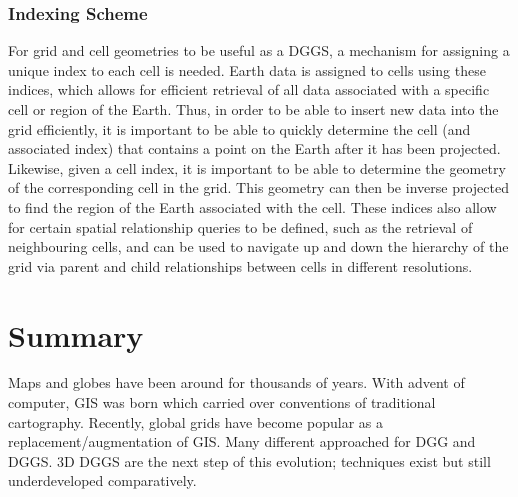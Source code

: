 \subsubsection{Indexing Scheme} \label{sec::dggs:indexing}
For grid and cell geometries to be useful as a DGGS, a mechanism for assigning a unique index to each cell is needed.
Earth data is assigned to cells using these indices, which allows for efficient retrieval of all data associated with a specific cell or region of the Earth.
Thus, in order to be able to insert new data into the grid efficiently, it is important to be able to quickly determine the cell (and associated index) that contains a point on the Earth after it has been projected.
Likewise, given a cell index, it is important to be able to determine the geometry of the corresponding cell in the grid.
This geometry can then be inverse projected to find the region of the Earth associated with the cell.
These indices also allow for certain spatial relationship queries to be defined, such as the retrieval of neighbouring cells, and can be used to navigate up and down the hierarchy of the grid via parent and child relationships between cells in different resolutions.
\cite{yu2009coding}
\cite{vince2006indexing}
\cite{tong2013efficient}
\cite{mahdavi2015categorization}


\section{Summary}
Maps and globes have been around for thousands of years.
With advent of computer, GIS was born which carried over conventions of traditional cartography.
Recently, global grids have become popular as a replacement/augmentation of GIS.
Many different approached for DGG and DGGS.
3D DGGS are the next step of this evolution; techniques exist but still underdeveloped comparatively.
